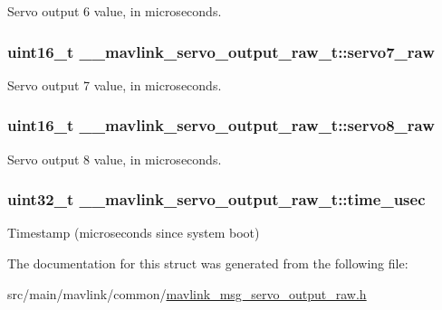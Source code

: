Servo output 6 value, in microseconds. 

\hypertarget{struct____mavlink__servo__output__raw__t_acc5571463987b3d5079ab1afb2556895}{
\subsubsection[{servo7\+\_\+raw}]{\setlength{\rightskip}{0pt plus 5cm}uint16\+\_\+t \+\_\+\+\_\+mavlink\+\_\+servo\+\_\+output\+\_\+raw\+\_\+t\+::servo7\+\_\+raw}}\label{struct____mavlink__servo__output__raw__t_acc5571463987b3d5079ab1afb2556895}


Servo output 7 value, in microseconds. 

\hypertarget{struct____mavlink__servo__output__raw__t_a1bf5dcc6a436529fc0d89ebf56d2a980}{
\subsubsection[{servo8\+\_\+raw}]{\setlength{\rightskip}{0pt plus 5cm}uint16\+\_\+t \+\_\+\+\_\+mavlink\+\_\+servo\+\_\+output\+\_\+raw\+\_\+t\+::servo8\+\_\+raw}}\label{struct____mavlink__servo__output__raw__t_a1bf5dcc6a436529fc0d89ebf56d2a980}


Servo output 8 value, in microseconds. 

\hypertarget{struct____mavlink__servo__output__raw__t_a77950505a736593e2c35132a1688c8f1}{
\subsubsection[{time\+\_\+usec}]{\setlength{\rightskip}{0pt plus 5cm}uint32\+\_\+t \+\_\+\+\_\+mavlink\+\_\+servo\+\_\+output\+\_\+raw\+\_\+t\+::time\+\_\+usec}}\label{struct____mavlink__servo__output__raw__t_a77950505a736593e2c35132a1688c8f1}


Timestamp (microseconds since system boot) 



The documentation for this struct was generated from the following file\+:\begin{DoxyCompactItemize}
\item 
src/main/mavlink/common/\hyperlink{mavlink__msg__servo__output__raw_8h}{mavlink\+\_\+msg\+\_\+servo\+\_\+output\+\_\+raw.\+h}\end{DoxyCompactItemize}
